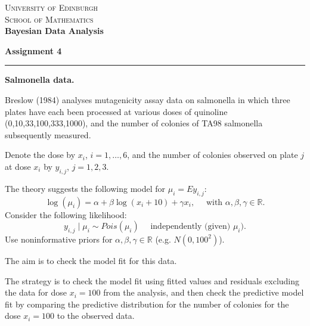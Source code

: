 \documentclass[12pt]{report}
\begin{document}
\def \bbeta{\mbox {\boldmath $\beta$}}
\def \btheta{\mbox {\boldmath $\theta$}}
\def \bmu{\mbox {\boldmath $\mu$}}
\def \ttheta{{\theta}}
\def \tmu{{\mu}}
\def \tbu{{\bf U}}
\def \tby{{\bf Y}}
\def \tbz{{\bf Z}}
\def \ta{{A}}
\def \tb{{B}}
\def \tn{{N}}
\def \tr{{R}}
\def \ts{{S}}
\def \tt{{T}}
\def \tu{{U}}
\def \tx{{X}}
\def \ty{{Y}}
\def \tz{{Z}}
\def \bb{\bf b}
\def \bm{\bf m}
\def \bn{\bf n}
\def \by{\bf y}
\def \bz{\bf z}
\def \bX{\bf X}

\begin{center}
\vspace*{-.5cm}\textsc{University of Edinburgh}\\
\textsc{School of Mathematics}\\
\vspace{.25cm} \textbf{\large Bayesian Data Analysis}
\end{center}

\textbf{Assignment 4}
\vspace{.2cm}
\hrule
\vspace{0.2cm}

\begin{center}
{\bf Salmonella data.}
\end{center}

\vspace{0.3cm}

Breslow (1984) analyses mutagenicity assay data on salmonella in which three plates have each been processed at various doses of quinoline (0,10,33,100,333,1000),  and the number of  colonies of TA98 salmonella subsequently measured.

\vspace{0.1cm}

Denote the dose by $x_i$, $i=1,\ldots,6$, and the number of colonies observed on plate $j$ at dose $x_i$ by $y_{i,j}$, $j=1,2,3$.

The theory suggests the following model for $\mu_{i} = E y_{i,j}$:
$$
\log (\mu_i) = \alpha + \beta \log(x_i + 10) + \gamma x_i, \quad \text{ with } \alpha,\beta,\gamma \in \mathbb{R}.
$$
Consider the following likelihood:
$$
y_{i,j} \mid \mu_i \sim Pois(\mu_i) \quad \text{ independently (given) } \mu_i ).
$$
Use noninformative priors for $\alpha,\beta,\gamma \in \mathbb{R}$ (e.g. $N(0, 100^2)$).

The aim is to check the model fit for this data.

The strategy is to check the model fit using fitted values and residuals excluding the data for dose $x_i = 100$ from the analysis, and then check the predictive model fit by comparing the predictive distribution for the number of colonies for the dose $x_i = 100$ to the observed data. 
\end{document}
